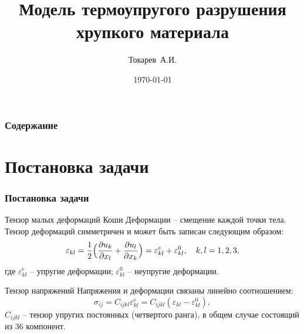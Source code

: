 \documentclass[unicode]{beamer}
\title[Курсовая работа]{Модель термоупругого разрушения хрупкого материала}
\author[Токарев~А.И.]{Токарев~А.И.}
\institute[]{МГТУ им. Н.Э. Баумана}
\date{\today}
\begin{document}
    \begin{frame}
        \titlepage
    \end{frame}

    \begin{frame}
        \frametitle{Содержание}
        \tableofcontents
    \end{frame}

    \section{Постановка задачи}

    \begin{frame}
        \frametitle{Постановка задачи}
        \begin{block}{Тензор малых деформаций Коши}
            \fontsize{10.4pt}{12pt}\selectfont
            Деформации -- смещение каждой точки тела. Тензор деформаций симметричен и может быть записан следующим образом:
            \[
                \varepsilon_{kl} = \dfrac{1}{2}\Bigl( \dfrac{\partial u_k}{\partial x_l} + \dfrac{\partial u_l}{\partial x_k} \Bigr) = \varepsilon_{kl}^e +  \varepsilon_{kl}^0, \quad k, l = 1, 2, 3,  
            \]
            \noindent где $\varepsilon_{kl}^e$ -- упругие деформации; $\varepsilon_{kl}^0$ -- неупругие деформации.
        \end{block}

        \begin{block}{Тензор напряжений}
            \fontsize{10.4pt}{12pt}\selectfont
            Напряжения и деформации связаны линейно соотношением:
            \[
                \sigma_{ij} = C_{ijkl} \varepsilon_{kl}^e = C_{ijkl}(\varepsilon_{kl} - \varepsilon_{kl}^0),
            \]
            \noindent $C_{ijkl}$ -- тензор упругих постоянных (четвертого ранга), в общем случае состоящий из $36$ компонент. 
        \end{block}
    \end{frame}
\end{document}
